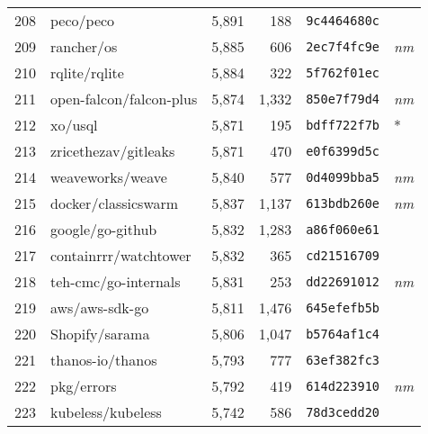 {\begin{supertabular}{llrrll}
        208 &                          peco/peco &  5,891 &    188 &  \texttt{9c4464680c} &              \\
        209 &                         rancher/os &  5,885 &    606 &  \texttt{2ec7f4fc9e} &  \textit{nm} \\
        210 &                      rqlite/rqlite &  5,884 &    322 &  \texttt{5f762f01ec} &              \\
        211 &            open-falcon/falcon-plus &  5,874 &  1,332 &  \texttt{850e7f79d4} &  \textit{nm} \\
        212 &                            xo/usql &  5,871 &    195 &  \texttt{bdff722f7b} &            * \\
        213 &               zricethezav/gitleaks &  5,871 &    470 &  \texttt{e0f6399d5c} &              \\
        214 &                   weaveworks/weave &  5,840 &    577 &  \texttt{0d4099bba5} &  \textit{nm} \\
        215 &                docker/classicswarm &  5,837 &  1,137 &  \texttt{613bdb260e} &  \textit{nm} \\
        216 &                   google/go-github &  5,832 &  1,283 &  \texttt{a86f060e61} &              \\
        217 &              containrrr/watchtower &  5,832 &    365 &  \texttt{cd21516709} &              \\
        218 &               teh-cmc/go-internals &  5,831 &    253 &  \texttt{dd22691012} &  \textit{nm} \\
        219 &                     aws/aws-sdk-go &  5,811 &  1,476 &  \texttt{645efefb5b} &              \\
        220 &                     Shopify/sarama &  5,806 &  1,047 &  \texttt{b5764af1c4} &              \\
        221 &                   thanos-io/thanos &  5,793 &    777 &  \texttt{63ef382fc3} &              \\
        222 &                         pkg/errors &  5,792 &    419 &  \texttt{614d223910} &  \textit{nm} \\
        223 &                  kubeless/kubeless &  5,742 &    586 &  \texttt{78d3cedd20} &              \\

\end{supertabular}}
